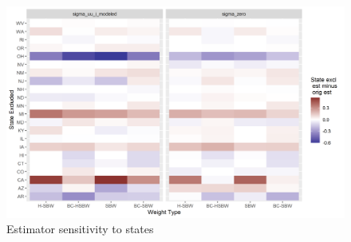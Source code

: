 \documentclass[aoas]{imsart}
\theoremstyle{plain}
\theoremstyle{remark}
\begin{document}
\begin{figure}
\begin{center}
    \caption{Estimator sensitivity to states}
    \label{fig:loostateplot}
    \includegraphics[scale=0.6]{01_Plots/loostate-sensitivityc1-state-uu-i.png}
\end{center}
\end{figure}
\end{document}
